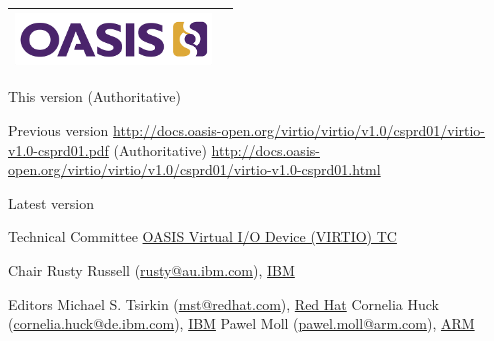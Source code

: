 \begin{titlepage}
\thispagestyle{fancy}

\begin{tabular*}{\textwidth}{@{\extracolsep{\fill}}lr}
	\includegraphics[height=0.55in]{images/oasis.png}\\
	\hline
\end{tabular*}

\oasistitle{\virtioversion}
\oasisstagelabel{\virtiodraftstagename\virtiodraftstageextratitle}
\vspace{0.05in}
\oasisstagelabel{\virtioworkingdraftdate}


\begin{oasistitlesection}{This version}
\virtiourltex{ }(Authoritative)\newline
\virtiourlpdf\newline
\virtiourlhtml
\end{oasistitlesection}

\begin{oasistitlesection}{Previous version}
\url{http://docs.oasis-open.org/virtio/virtio/v1.0/csprd01/virtio-v1.0-csprd01.pdf}
{ }(Authoritative)\newline
\url{http://docs.oasis-open.org/virtio/virtio/v1.0/csprd01/virtio-v1.0-csprd01.html}
\end{oasistitlesection}

\begin{oasistitlesection}{Latest version}
\virtiourllatestpdf\newline
\virtiourllatesthtml
\end{oasistitlesection}

\begin{oasistitlesection}{Technical Committee}
\href{https://www.oasis-open.org/committees/virtio/}{OASIS Virtual I/O Device (VIRTIO) TC}
\end{oasistitlesection}

\begin{oasistitlesection}{Chair}
Rusty Russell (\href{mailto:rusty@au.ibm.com}{rusty@au.ibm.com}), \href{http://www.ibm.com/}{IBM}\newline
\end{oasistitlesection}

\begin{oasistitlesection}{Editors}
Michael S. Tsirkin (\href{mailto:mst@redhat.com}{mst@redhat.com}), \href{http://www.redhat.com/}{Red Hat}\newline
Cornelia Huck (\href{mailto:cornelia.huck@de.ibm.com}{cornelia.huck@de.ibm.com}), \href{http://www.ibm.com/}{IBM}\newline
Pawel Moll (\href{mailto:pawel.moll@arm.com}{pawel.moll@arm.com}), \href{https://arm.com/}{ARM}
\end{oasistitlesection}



\end{titlepage}
